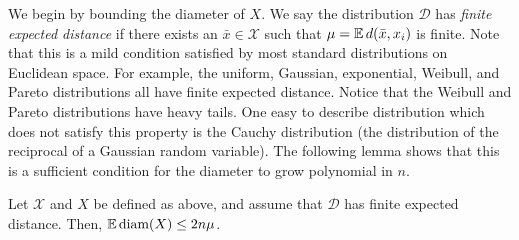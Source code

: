 \documentclass[../main.tex]{subfiles}
\newcommand{\set}[1]{\mathcal {#1}}
\newcommand{\distribution}[1]{\mathcal {#1}}
\newcommand{\dist}[2]{\distf({#1},{#2})}
\newcommand{\distf}{d}
\newcommand{\diam}[1]{\text{diam}({#1})}
\begin{document}
We begin by bounding the diameter of $X$.
We say the distribution $\distribution D$ has \emph{finite expected distance} if there exists an $\bar x\in\set X$ such that $\mu=\E\dist{\bar x}{x_i}$ is finite.
Note that this is a mild condition satisfied by most standard distributions on Euclidean space.
For example, the uniform, Gaussian, exponential, Weibull, and Pareto distributions all have finite expected distance.
Notice that the Weibull and Pareto distributions have heavy tails.
One easy to describe distribution which does not satisfy this property is the Cauchy distribution 
(the distribution of the reciprocal of a Gaussian random variable).
The following lemma shows that this is a sufficient condition for the diameter to grow polynomial in $n$.

\begin{lemma}
    \label{lemma:Ediam}
    Let $\set X$ and $X$ be defined as above,
    and assume that $\distribution D$ has finite expected distance.
    Then, $\E\diam{X} \le 2n\mu$.
\end{lemma}
\end{document}
